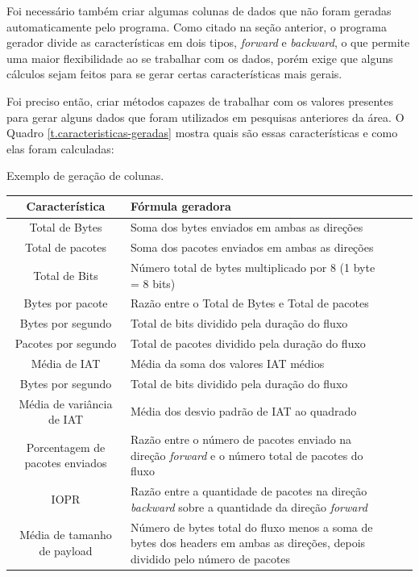 Foi necessário também criar algumas colunas de dados que não foram geradas automaticamente pelo programa. Como citado na seção anterior, o programa gerador divide as características em dois tipos, \textit{forward} e \textit{backward}, o que permite uma maior flexibilidade ao se trabalhar com os dados, porém exige que alguns cálculos sejam feitos para se gerar certas características mais gerais.

Foi preciso então, criar métodos capazes de trabalhar com os valores presentes para gerar alguns dados que foram utilizados em pesquisas anteriores da área. O Quadro \ref{t.caracteristicas-geradas} mostra quais são essas características e como elas foram calculadas:

\begin{quadro}[ht]
\caption{\small Exemplo de geração de colunas.}
\centering
\begin{tabular}{|c p{10cm}|l p{10cm}}
\hline
\textbf{\small Característica} & \textbf{\small Fórmula geradora}\\\hline \hline
{\small Total de Bytes} & {\small Soma dos bytes enviados em ambas as direções}\\\hline
{\small Total de pacotes} & {\small Soma dos pacotes enviados em ambas as direções}\\\hline
{\small Total de Bits} & {\small Número total de bytes multiplicado por 8 (1 byte = 8 bits)}\\\hline
{\small Bytes por pacote} & {\small Razão entre o Total de Bytes e Total de pacotes}\\\hline
{\small Bytes por segundo} & {\small Total de bits dividido pela duração do fluxo}\\\hline
{\small Pacotes por segundo} & {\small Total de pacotes dividido pela duração do fluxo}\\\hline
{\small Média de IAT} & {\small Média da soma dos valores IAT médios}\\\hline
{\small Bytes por segundo} & {\small Total de bits dividido pela duração do fluxo}\\\hline
{\small Média de variância de IAT} & {\small Média dos desvio padrão de IAT ao quadrado}\\\hline
{\small Porcentagem de pacotes enviados} & {\small Razão entre o número de pacotes enviado na direção \textit{forward} e o número total de pacotes do fluxo}\\\hline
{\small IOPR} & {\small Razão entre a quantidade de pacotes na direção \textit{backward} sobre a quantidade da direção \textit{forward}}\\\hline
{\small Média de tamanho de payload} & {\small Número de bytes total do fluxo menos a soma de bytes dos headers em ambas as direções, depois dividido pelo número de pacotes}\\\hline
\end{tabular}
\label{t.caracteristicas-geradas}
\end{quadro}

